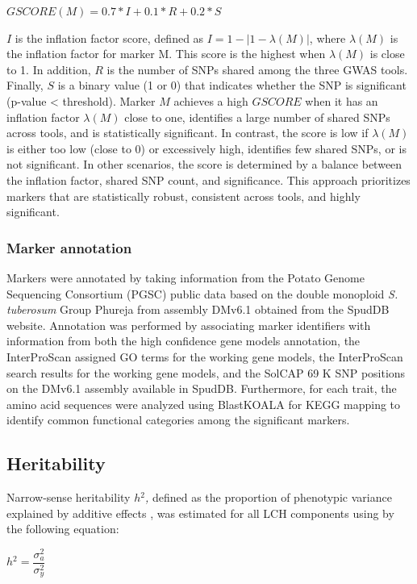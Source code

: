 \documentclass[pdflatex,sn-mathphys-ay]{sn-jnl}%
\begin{document}
\begin{center}
$GSCORE(M)=0.7*I+0.1*R+0.2*S$
\par\end{center}

 $I$ is the inflation factor score, defined as $I=1-|1-\lambda(M)|$, where $\lambda(M)$ is the inflation factor for marker M. This score is the highest when $\lambda(M)$ is close to 1. In addition, $R$ is the number of SNPs shared among the three GWAS tools. Finally, $S$ is a binary value (1 or 0) that indicates whether the SNP is significant (p-value < threshold). Marker $M$ achieves a high $GSCORE$ when it has an inflation factor $\lambda(M)$ close to one, identifies a large number of shared SNPs across tools, and is statistically significant. In contrast, the score is low if $\lambda(M)$ is either too low (close to 0) or excessively high, identifies few shared SNPs, or is not significant. In other scenarios, the score is determined by a balance between the inflation factor, shared SNP count, and significance. This approach prioritizes markers that are statistically robust, consistent across tools, and highly significant.


\subsubsection*{Marker annotation\label{subsec:OwnScoreFunction}}
Markers were annotated by taking information from the Potato Genome Sequencing Consortium (PGSC) public data based on the double monoploid \textit{S. tuberosum} Group Phureja from assembly DMv6.1\citep{Pham2020} obtained from the SpudDB website. Annotation was performed by associating marker identifiers with information from both the high confidence gene models annotation, the InterProScan assigned GO terms for the working gene models, the InterProScan search results for the working gene models, and the SolCAP 69 K SNP positions on the DMv6.1 assembly available in SpudDB. Furthermore, for each trait, the amino acid sequences were analyzed using BlastKOALA \citep{kanehisa2016blastkoala} for KEGG mapping to identify common functional categories among the significant markers.



\subsection{Heritability}

Narrow-sense heritability \emph{$h{{}^2}$,} defined as the proportion of phenotypic variance explained by additive effects \citep{Campos2015}, was estimated for all LCH components using by the following equation:
\begin{center}
$h{{}^2}=\dfrac{\sigma_{a}^{2}}{\sigma_{y}^{2}}$
\par\end{center}
\end{document}
